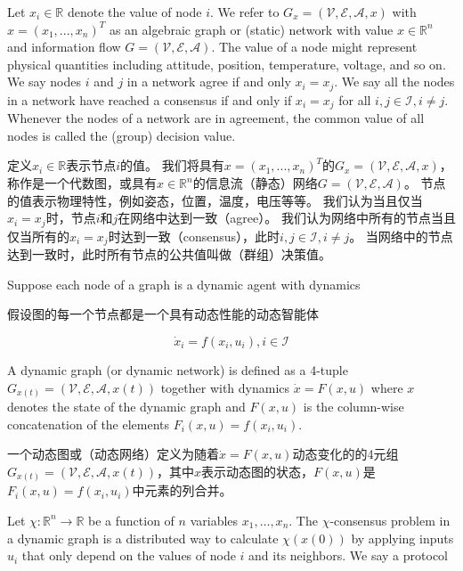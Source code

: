 \documentclass{article}
\begin{document}
{\color[gray]{0.5}
Let $x_i\in \mathbb{R}$ denote the value of node $i$. 
We refer to $G_x=(\mathcal{V},\mathcal{E},\mathcal{A},x)$ with $x=(x_1,...,x_n)^T$ as an algebraic graph or (static) network with value $x\in \mathbb{R}^n$ and information ﬂow $G=(\mathcal{V},\mathcal{E},\mathcal{A})$. 
The value of a node might represent physical quantities including attitude, position, temperature, voltage, and so on. 
We say nodes $i$ and $j$ in a network agree if and only $x_i=x_j$. 
We say all the nodes in a network have reached a consensus if and only if $x_i=x_j$ for all $i,j\in \mathcal{I}, i\ne j$. 
Whenever the nodes of a network are in agreement, the common value of all nodes is called the (group) decision value.
}

定义$x_i\in \mathbb{R}$表示节点$i$的值。
我们将具有$x=(x_1,...,x_n)^T$的$G_x=(\mathcal{V},\mathcal{E},\mathcal{A},x)$，称作是一个代数图，或具有$x\in \mathbb{R}^n$的信息流（静态）网络$G=(\mathcal{V},\mathcal{E},\mathcal{A})$。
节点的值表示物理特性，例如姿态，位置，温度，电压等等。
我们认为当且仅当$x_i=x_j$时，节点$i$和$j$在网络中达到一致（agree）。
我们认为网络中所有的节点当且仅当所有的$x_i=x_j$时达到一致（consensus），此时$i,j\in \mathcal{I}, i\ne j$。
当网络中的节点达到一致时，此时所有节点的公共值叫做（群组）决策值。

{\color[gray]{0.5}
Suppose each node of a graph is a dynamic agent with dynamics
}

假设图的每一个节点都是一个具有动态性能的动态智能体

\begin{equation}
    \dot{x}_i = f(x_i, u_i), i\in \mathcal{I}
    \tag{2}
    \label{2}
\end{equation}

{\color[gray]{0.5}
\noindent A dynamic graph (or dynamic network) is deﬁned as a 4-tuple $G_{x(t)} = (\mathcal{V},\mathcal{E},\mathcal{A},x(t))$ together with dynamics $\dot{x}=F(x,u)$ where $x$ denotes the state of the dynamic graph and {\color{green}$F(x,u)$ is the column-wise concatenation of the elements $F_i(x,u)=f(x_i,u_i)$}.
}

\noindent 一个动态图或（动态网络）定义为随着$\dot{x}=F(x,u)$动态变化的的4元组$G_{x(t)} = (\mathcal{V},\mathcal{E},\mathcal{A},x(t))$，其中$x$表示动态图的状态，$F(x,u)$是$F_i(x,u)=f(x_i,u_i)$中元素的列合并。

{\color[gray]{0.5}
Let $\chi: \mathbb{R}^n \rightarrow \mathbb{R}$ be a function of $n$ variables $x_1,\dots,x_n$. 
The $\chi$-consensus problem in a dynamic graph is a distributed way to calculate $\chi(x(0))$ by applying inputs $u_i$ that only depend on the values of node $i$ and its neighbors. 
We say a protocol
}
\end{document}
